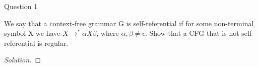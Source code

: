 \begin{solution}{Question 1}\label{ques:1}
    \begin{question}
    We say that a context-free grammar G is self-referential if for some non-terminal symbol X we have $X\longrightarrow^* \alpha X \beta$, where $\alpha,\beta \neq \epsilon$. Show that a CFG that is not self-referential is regular.
    \end{question}
    \tcblower{}
    \begin{proof}[Solution]
    \end{proof}
\end{solution}
